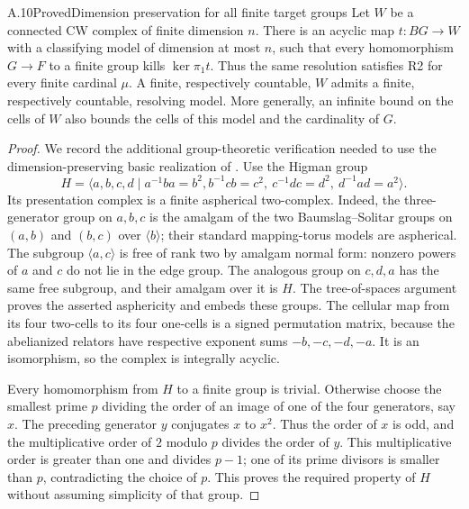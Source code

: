 \begin{claim}{A.10}{Proved}{Dimension preservation for all finite target groups}
Let $W$ be a connected CW complex of finite dimension $n$. There is
an acyclic map $t:BG\to W$ with a classifying model of dimension at
most $n$, such that every homomorphism $G\to F$ to a finite group
kills $\ker\pi_1t$. Thus the same resolution satisfies R2 for every
finite cardinal $\mu$. A finite, respectively countable, $W$ admits
a finite, respectively countable, resolving model. More generally,
an infinite bound on the cells of $W$ also bounds the cells of this
model and the cardinality of $G$.
\end{claim}
\begin{proof}
We record the additional group-theoretic verification needed to use
the dimension-preserving basic realization of
\cite[Sections 9--10]{A_BDH1980}. Use the Higman group
\[
 H=\langle a,b,c,d\mid a^{-1}ba=b^2,
 b^{-1}cb=c^2,\ c^{-1}dc=d^2,\ d^{-1}ad=a^2\rangle.
\]
Its presentation complex is a finite aspherical two-complex. Indeed,
the three-generator group on $a,b,c$ is the amalgam of the two
Baumslag--Solitar groups on $(a,b)$ and $(b,c)$ over $\langle b\rangle$;
their standard mapping-torus models are aspherical. The subgroup
$\langle a,c\rangle$ is free of rank two by amalgam normal form:
nonzero powers of $a$ and $c$ do not lie in the edge group.
The analogous group on $c,d,a$ has the same free subgroup, and their
amalgam over it is $H$. The tree-of-spaces argument proves the asserted
asphericity and embeds these groups. The cellular map from its four
two-cells to its four one-cells is a signed permutation matrix, because
the abelianized relators have respective exponent sums $-b,-c,-d,-a$.
It is an isomorphism, so the complex is integrally acyclic.

Every homomorphism from $H$ to a finite group is trivial. Otherwise
choose the smallest prime $p$ dividing the order of an image of one
of the four generators, say $x$. The preceding generator $y$
conjugates $x$ to $x^2$. Thus the order of $x$ is odd, and the
multiplicative order of $2$ modulo $p$ divides the order of $y$.
This multiplicative order is greater than one and divides $p-1$;
one of its prime divisors is smaller than $p$, contradicting the
choice of $p$. This proves the required property of $H$ without
assuming simplicity of that group.


\end{proof}
